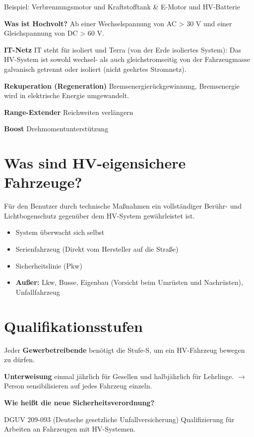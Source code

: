 Beispiel: Verbrennungsmotor und Kraftstofftank \& E-Motor und
HV-Batterie

\textbf{Was ist Hochvolt?} Ab einer Wechselspannung von AC
> 30 V und einer Gleichspannung von DC > 60 V.

\textbf{IT-Netz} IT steht für isoliert und Terra (von der Erde
isoliertes System): Das HV-System ist sowohl wechsel- als auch
gleichstromseitig von der Fahrzeugmasse galvanisch getrennt oder
isoliert (nicht geehrtes Stromnetz).

\textbf{Rekuperation (Regeneration)} Bremsenergierückgewinnung,
Bremsenergie wird in elektrische Energie umgewandelt.

\textbf{Range-Extender} Reichweiten verlängern

\textbf{Boost} Drehmomentunterstützung

\section{Was sind HV-eigensichere
Fahrzeuge?}\label{was-sind-hv-eigensichere-fahrzeuge}

Für den Benutzer durch technische Maßnahmen ein vollständiger Berühr-
und Lichtbogenschutz gegenüber dem HV-System gewährleistet ist.

\begin{itemize}
\item
  System überwacht sich selbst
\item
  Serienfahrzeug (Direkt vom Hersteller auf die Straße)
\item
  Sicherheitslinie (Pkw)
\item
  \textbf{Außer:} Lkw, Busse, Eigenbau (Vorsicht beim Umrüsten und
  Nachrüsten), Unfallfahrzeug
\end{itemize}

\section{Qualifikationsstufen}\label{qualifikationsstufen}

Jeder \textbf{Gewerbetreibende} benötigt die Stufe-S, um ein HV-Fahrzeug
bewegen zu dürfen.

\textbf{Unterweisung} einmal jährlich für Gesellen und halbjährlich für
Lehrlinge. $\to$ Person sensibilisieren auf jedes Fahrzeug einzeln.

\textbf{Wie heißt die neue Sicherheitsverordnung?}

DGUV 209-093 (Deutsche gesetzliche Unfallversicherung) Qualifizierung
für Arbeiten an Fahrzeugen mit HV-Systemen.

